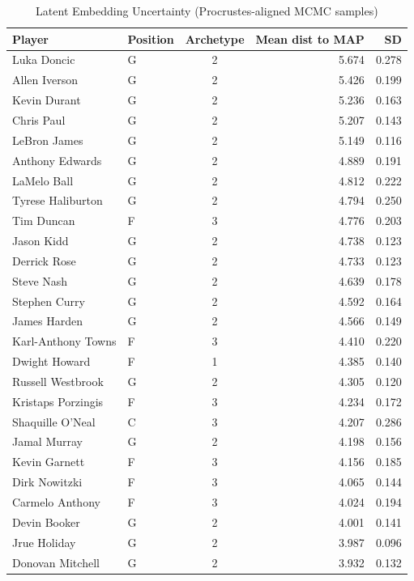 \begin{table}[t]
\caption*{
{\fontsize{20}{25}\selectfont  Latent Embedding Uncertainty (Procrustes-aligned MCMC samples)\fontsize{12}{15}\selectfont }
} 
\fontsize{12.0pt}{14.0pt}\selectfont
\begin{tabular*}{\linewidth}{@{\extracolsep{\fill}}llcrr}
\toprule
Player & Position & Archetype & Mean dist to MAP & SD \\ 
\midrule\addlinespace[2.5pt]
Luka Doncic & G & 2 & 5.674 & 0.278 \\ 
Allen Iverson & G & 2 & 5.426 & 0.199 \\ 
Kevin Durant & G & 2 & 5.236 & 0.163 \\ 
Chris Paul & G & 2 & 5.207 & 0.143 \\ 
LeBron James & G & 2 & 5.149 & 0.116 \\ 
Anthony Edwards & G & 2 & 4.889 & 0.191 \\ 
LaMelo Ball & G & 2 & 4.812 & 0.222 \\ 
Tyrese Haliburton & G & 2 & 4.794 & 0.250 \\ 
Tim Duncan & F & 3 & 4.776 & 0.203 \\ 
Jason Kidd & G & 2 & 4.738 & 0.123 \\ 
Derrick Rose & G & 2 & 4.733 & 0.123 \\ 
Steve Nash & G & 2 & 4.639 & 0.178 \\ 
Stephen Curry & G & 2 & 4.592 & 0.164 \\ 
James Harden & G & 2 & 4.566 & 0.149 \\ 
Karl-Anthony Towns & F & 3 & 4.410 & 0.220 \\ 
Dwight Howard & F & 1 & 4.385 & 0.140 \\ 
Russell Westbrook & G & 2 & 4.305 & 0.120 \\ 
Kristaps Porzingis & F & 3 & 4.234 & 0.172 \\ 
Shaquille O'Neal & C & 3 & 4.207 & 0.286 \\ 
Jamal Murray & G & 2 & 4.198 & 0.156 \\ 
Kevin Garnett & F & 3 & 4.156 & 0.185 \\ 
Dirk Nowitzki & F & 3 & 4.065 & 0.144 \\ 
Carmelo Anthony & F & 3 & 4.024 & 0.194 \\ 
Devin Booker & G & 2 & 4.001 & 0.141 \\ 
Jrue Holiday & G & 2 & 3.987 & 0.096 \\ 
Donovan Mitchell & G & 2 & 3.932 & 0.132 \\ 

\end{tabular*}
\end{table}
